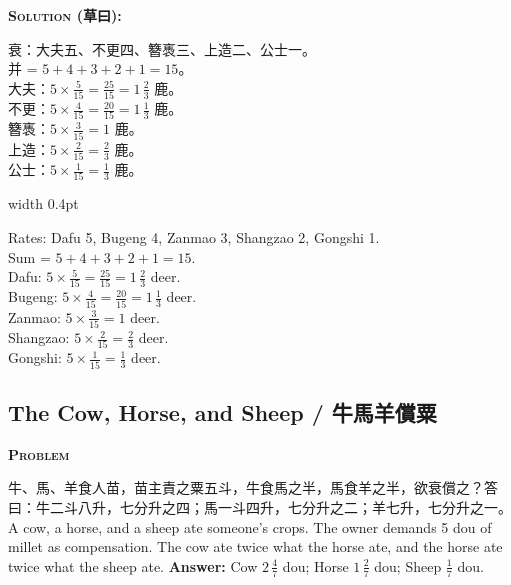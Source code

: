 \documentclass[10pt,a4paper]{article}
\newcommand{\zh}[1]{{\CJKfamily{notocjksc}#1}}
\newcommand{\bilingual}[2]{%
  \par\smallskip\noindent%
  \begin{minipage}[t]{0.47\textwidth}%
    \RaggedRight\small #1%
  \end{minipage}%
  \hfill\vrule width 0.4pt\hfill%
  \begin{minipage}[t]{0.47\textwidth}%
    \RaggedRight\small #2%
  \end{minipage}%
  \par\smallskip%
}
\newenvironment{biproblem}[2][]{%
  \par\smallskip\vspace{1.5ex}%
  \noindent\textbf{\textcolor{problemframe}{\textsc{Problem} #1}}\par\smallskip
  \bgroup\small%
}{%
  \egroup\par\smallskip
}
\newenvironment{bisolution}{%
  \par\smallskip\noindent\textbf{\textcolor{notecolor}{\textsc{Solution} (草曰):}}\par\smallskip\itshape\small%
}{%
  \par\smallskip\normalfont%
}
\begin{document}
\begin{bisolution}
\bilingual{
  衰：大夫五、不更四、簪褭三、上造二、公士一。\\
  并 = $5 + 4 + 3 + 2 + 1 = 15$。\\
  大夫：$5 \times \frac{5}{15} = \frac{25}{15} = 1\,\frac{2}{3}$ 鹿。\\
  不更：$5 \times \frac{4}{15} = \frac{20}{15} = 1\,\frac{1}{3}$ 鹿。\\
  簪褭：$5 \times \frac{3}{15} = 1$ 鹿。\\
  上造：$5 \times \frac{2}{15} = \frac{2}{3}$ 鹿。\\
  公士：$5 \times \frac{1}{15} = \frac{1}{3}$ 鹿。
}{%
  Rates: Dafu 5, Bugeng 4, Zanmao 3, Shangzao 2, Gongshi 1.\\
  Sum = $5 + 4 + 3 + 2 + 1 = 15$.\\
  Dafu: $5 \times \frac{5}{15} = \frac{25}{15} = 1\,\frac{2}{3}$ deer.\\
  Bugeng: $5 \times \frac{4}{15} = \frac{20}{15} = 1\,\frac{1}{3}$ deer.\\
  Zanmao: $5 \times \frac{3}{15} = 1$ deer.\\
  Shangzao: $5 \times \frac{2}{15} = \frac{2}{3}$ deer.\\
  Gongshi: $5 \times \frac{1}{15} = \frac{1}{3}$ deer.
}
\end{bisolution}

\subsection{The Cow, Horse, and Sheep / 牛馬羊償粟}

\begin{biproblem}
\bilingual{
  \zh{牛、馬、羊食人苗，苗主責之粟五斗，牛食馬之半，馬食羊之半，欲衰償之？答曰：牛二斗八升，七分升之四；馬一斗四升，七分升之二；羊七升，七分升之一。}
}{%
  A cow, a horse, and a sheep ate someone's crops. The owner demands 5 dou of millet as compensation. The cow ate twice what the horse ate, and the horse ate twice what the sheep ate. \textbf{Answer:} Cow $2\,\frac{4}{7}$ dou; Horse $1\,\frac{2}{7}$ dou; Sheep $\frac{1}{7}$ dou.
}
\end{biproblem}
\end{document}
